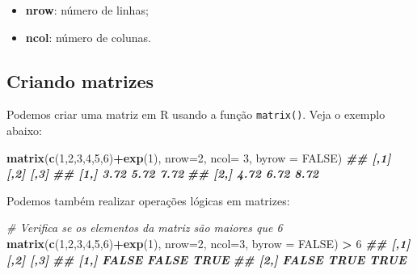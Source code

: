 \documentclass[
]{book}
\newenvironment{Shaded}{\begin{snugshade}}{\end{snugshade}}
\newcommand{\AttributeTok}[1]{\textcolor[rgb]{0.13,0.29,0.53}{#1}}
\newcommand{\CommentTok}[1]{\textcolor[rgb]{0.56,0.35,0.01}{\textit{#1}}}
\newcommand{\ConstantTok}[1]{\textcolor[rgb]{0.56,0.35,0.01}{#1}}
\newcommand{\DecValTok}[1]{\textcolor[rgb]{0.00,0.00,0.81}{#1}}
\newcommand{\DocumentationTok}[1]{\textcolor[rgb]{0.56,0.35,0.01}{\textbf{\textit{#1}}}}
\newcommand{\FunctionTok}[1]{\textcolor[rgb]{0.13,0.29,0.53}{\textbf{#1}}}
\newcommand{\NormalTok}[1]{#1}
\newcommand{\SpecialCharTok}[1]{\textcolor[rgb]{0.81,0.36,0.00}{\textbf{#1}}}
\begin{document}
\begin{itemize}
\item
  \textbf{nrow}: número de linhas;
\item
  \textbf{ncol}: número de colunas.
\end{itemize}

\subsection{Criando matrizes}\label{criando-matrizes}

Podemos criar uma matriz em R usando a função \texttt{matrix()}. Veja o exemplo
abaixo:

\begin{Shaded}
\begin{Highlighting}[]
\FunctionTok{matrix}\NormalTok{(}\FunctionTok{c}\NormalTok{(}\DecValTok{1}\NormalTok{,}\DecValTok{2}\NormalTok{,}\DecValTok{3}\NormalTok{,}\DecValTok{4}\NormalTok{,}\DecValTok{5}\NormalTok{,}\DecValTok{6}\NormalTok{)}\SpecialCharTok{+}\FunctionTok{exp}\NormalTok{(}\DecValTok{1}\NormalTok{), }\AttributeTok{nrow=}\DecValTok{2}\NormalTok{, }\AttributeTok{ncol=} \DecValTok{3}\NormalTok{, }\AttributeTok{byrow =} \ConstantTok{FALSE}\NormalTok{)}
\DocumentationTok{\#\#      [,1] [,2] [,3]}
\DocumentationTok{\#\# [1,] 3.72 5.72 7.72}
\DocumentationTok{\#\# [2,] 4.72 6.72 8.72}
\end{Highlighting}
\end{Shaded}

Podemos também realizar operações lógicas em matrizes:

\begin{Shaded}
\begin{Highlighting}[]
\CommentTok{\# Verifica se os elementos da matriz são maiores que 6}
\FunctionTok{matrix}\NormalTok{(}\FunctionTok{c}\NormalTok{(}\DecValTok{1}\NormalTok{,}\DecValTok{2}\NormalTok{,}\DecValTok{3}\NormalTok{,}\DecValTok{4}\NormalTok{,}\DecValTok{5}\NormalTok{,}\DecValTok{6}\NormalTok{)}\SpecialCharTok{+}\FunctionTok{exp}\NormalTok{(}\DecValTok{1}\NormalTok{), }\AttributeTok{nrow=}\DecValTok{2}\NormalTok{, }\AttributeTok{ncol=}\DecValTok{3}\NormalTok{, }\AttributeTok{byrow =} \ConstantTok{FALSE}\NormalTok{) }\SpecialCharTok{\textgreater{}} \DecValTok{6}
\DocumentationTok{\#\#       [,1]  [,2] [,3]}
\DocumentationTok{\#\# [1,] FALSE FALSE TRUE}
\DocumentationTok{\#\# [2,] FALSE  TRUE TRUE}
\end{Highlighting}
\end{Shaded}
\end{document}
